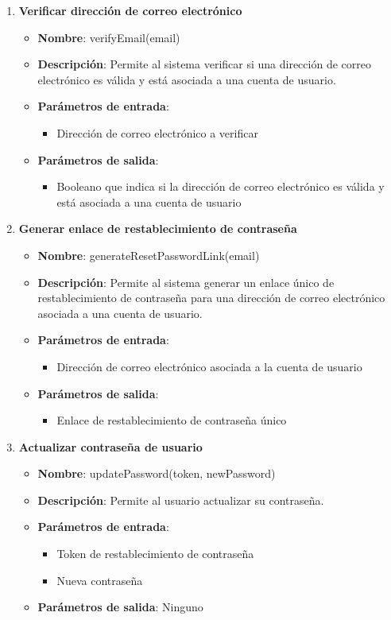 \begin{enumerate}[label=SOP-\protect\twodigits{\arabic*}:, align=left, leftmargin=*]
\item \textbf{Verificar dirección de correo electrónico}
\begin{itemize}
\item \textbf{Nombre}: verifyEmail(email)
\item \textbf{Descripción}: Permite al sistema verificar si una dirección de correo electrónico es válida y está asociada a una cuenta de usuario.
\item \textbf{Parámetros de entrada}:
\begin{itemize}
\item Dirección de correo electrónico a verificar
\end{itemize}
\item \textbf{Parámetros de salida}:
\begin{itemize}
\item Booleano que indica si la dirección de correo electrónico es válida y está asociada a una cuenta de usuario
\end{itemize}
\end{itemize}

\item \textbf{Generar enlace de restablecimiento de contraseña}
\begin{itemize}
\item \textbf{Nombre}: generateResetPasswordLink(email)
\item \textbf{Descripción}: Permite al sistema generar un enlace único de restablecimiento de contraseña para una dirección de correo electrónico asociada a una cuenta de usuario.
\item \textbf{Parámetros de entrada}:
\begin{itemize}
\item Dirección de correo electrónico asociada a la cuenta de usuario
\end{itemize}
\item \textbf{Parámetros de salida}:
\begin{itemize}
\item Enlace de restablecimiento de contraseña único
\end{itemize}
\end{itemize}

\item \textbf{Actualizar contraseña de usuario}
\begin{itemize}
\item \textbf{Nombre}: updatePassword(token, newPassword)
\item \textbf{Descripción}: Permite al usuario actualizar su contraseña.
\item \textbf{Parámetros de entrada}:
\begin{itemize}
\item Token de restablecimiento de contraseña
\item Nueva contraseña
\end{itemize}
\item \textbf{Parámetros de salida}: Ninguno
\end{itemize}


\end{enumerate}
